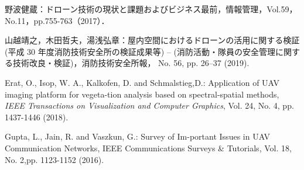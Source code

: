\documentclass[a4paper,10pt,twocolumn,uplatex]{jsarticle}
\begin{document}
\footnotesize{
  \begin{thebibliography}{99}
    野波健蔵：ドローン技術の現状と課題およびビジネス最前，情報管理，Vol.59，No.11，pp.755-763（2017）．
    
    山越靖之，木田哲夫，湯浅弘章：屋内空間におけるドローンの活用に関する検証 (平成 30 年度消防技術安全所の検証成果等) – (消防活動・隊員の安全管理に関する技術改良・検証)，消防技術安全所報， No. 56, pp. 26–37 (2019).
    
    Erat, O., Isop, W. A., Kalkofen, D. and Schmalstieg,D.: Application of UAV imaging platform for vegeta-tion analysis based on spectral-spatial methods, {\it IEEE Transactions on Visualization and Computer Graphics}, Vol. 24, No. 4, pp. 1437-1446 (2018).
    
    Gupta, L., Jain, R. and Vaszkun, G.: Survey of Im-portant Issues in UAV Communication Networks, IEEE Communications Surveys \& Tutorials, Vol. 18, No. 2,pp. 1123-1152 (2016).
    
  \end{thebibliography}
}

\end{document}
